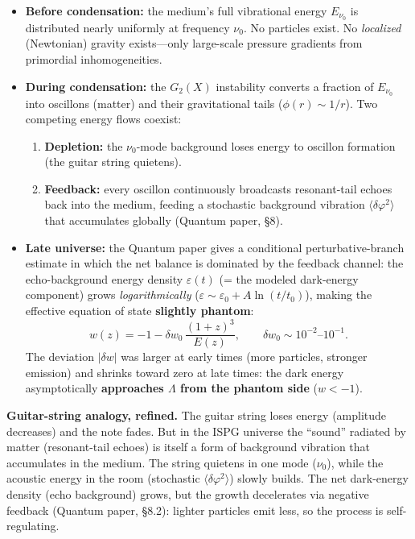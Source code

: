 \documentclass[11pt]{article}
\begin{document}
\begin{itemize}
  \item \textbf{Before condensation:} the medium's
    full vibrational energy $E_{\nu_0}$ is
    distributed nearly uniformly at frequency $\nu_0$.
    No particles exist. No \emph{localized}
    (Newtonian) gravity exists---only large-scale
    pressure gradients from primordial
    inhomogeneities.

  \item \textbf{During condensation:} the $G_2(X)$
    instability converts a fraction of
    $E_{\nu_0}$ into oscillons (matter) and
    their gravitational tails
    ($\phi(r) \sim 1/r$). Two competing energy
    flows coexist:
    \begin{enumerate}
      \item \textbf{Depletion:} the $\nu_0$-mode
        background loses energy to oscillon
        formation (the guitar string quietens).
      \item \textbf{Feedback:} every oscillon
        continuously broadcasts resonant-tail
        echoes back into the medium, feeding a
        stochastic background vibration
        $\langle\delta\varphi^2\rangle$ that
        accumulates globally
        (Quantum paper, \S8).
    \end{enumerate}

  \item \textbf{Late universe:} the Quantum paper
    gives a conditional perturbative-branch estimate in
    which the net balance is dominated by the feedback
    channel: the echo-background energy density
    $\varepsilon(t)$ (= the modeled dark-energy component) grows
    \emph{logarithmically}
    ($\varepsilon \sim \varepsilon_0 + A\ln(t/t_0)$),
    making the effective equation of state
    \textbf{slightly phantom}:
    \begin{equation}
      w(z) = -1 - \delta w_0\,
      \frac{(1+z)^{3}}{E(z)},
      \qquad \delta w_0 \sim 10^{-2}\text{--}10^{-1}.
      \label{eq:w_dark}
    \end{equation}
    The deviation $|\delta w|$ was larger at
    early times (more particles, stronger
    emission) and shrinks toward zero at late
    times: the dark energy asymptotically
    \textbf{approaches $\Lambda$ from the phantom
    side} ($w < -1$).
\end{itemize}

\textbf{Guitar-string analogy, refined.}
The guitar string loses energy (amplitude
decreases) and the note fades. But
in the ISPG universe the ``sound'' radiated
by matter (resonant-tail echoes) is itself
a form of background vibration that
accumulates in the medium. The string quietens
in one mode ($\nu_0$), while the acoustic
energy in the room (stochastic
$\langle\delta\varphi^2\rangle$)
slowly builds. The net dark-energy density
(echo background) grows, but the growth decelerates via
negative feedback (Quantum paper, \S8.2):
lighter particles emit less, so the process
is self-regulating.
\end{document}
